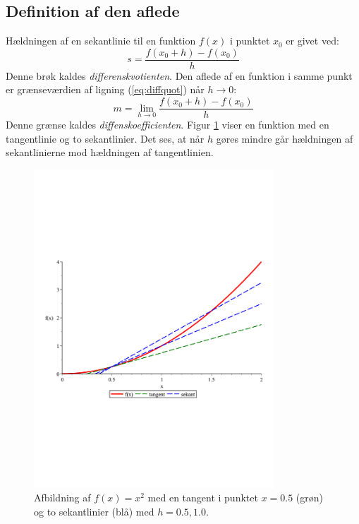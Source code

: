 \documentclass[a4paper, 12pt]{article}
\begin{document}
\subsection{Definition af den aflede}
Hældningen af en sekantlinie til en funktion $f(x)$ i punktet $x_0$ er givet ved:
\begin{equation} \label{eq:diffquot}
s = \frac{f(x_0+h) - f(x_0)}{h}
\end{equation}
Denne brøk kaldes \emph{differenskvotienten}. Den aflede af en funktion i samme punkt er grænseværdien af ligning (\ref{eq:diffquot}) når $h\to0$:
\begin{equation} \label{eq:diffcoef}
m = \lim_{h\to0}\frac{f(x_0+h) - f(x_0)}{h}
\end{equation}
Denne grænse kaldes \emph{diffenskoefficienten}.  Figur \ref{fig:secanttangent} viser en funktion med en tangentlinie og to sekantlinier. Det ses, at når $h$ gøres mindre går hældningen af sekantlinierne mod hældningen af tangentlinien.
\begin{figure}[b]
	\centering
	\includegraphics[width=0.8\textwidth, clip, trim=0 7.8cm 0 6cm]{secant}
	\caption{Afbildning af $f(x)=x^2$ med en tangent i punktet $x=0.5$ (grøn) og to sekantlinier (blå) med $h=0.5, 1.0$.}
	\label{fig:secanttangent}
\end{figure}
\end{document}
